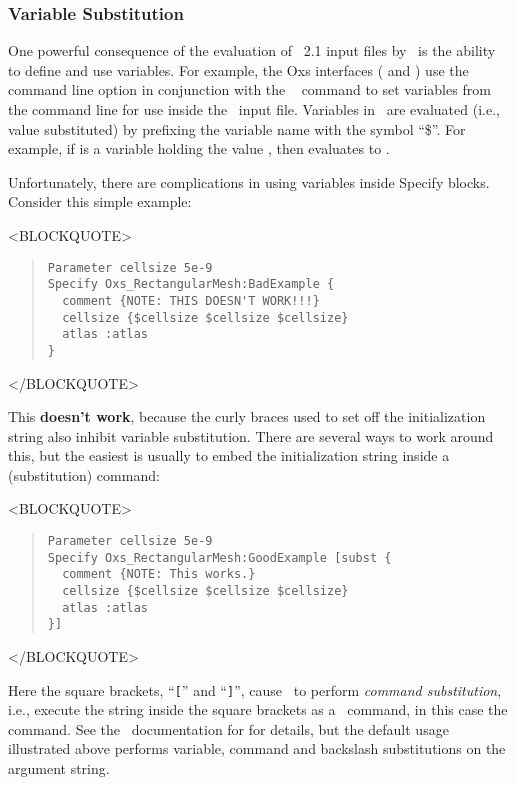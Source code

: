 \subsubsection{Variable Substitution}%
\label{sec:varSubst}
One powerful consequence of the evaluation of \MIF~2.1 input files by
\Tcl\ is the ability to define and use variables.  For example,
the Oxs interfaces ( and )
use the  command line option in conjunction with
the \MIF\  command to
set variables from the command line for use inside the \MIF\ input file.
Variables in \Tcl\ are evaluated (i.e., value substituted)
by prefixing the variable name with the symbol ``\$''.  For example, if
 is a variable holding the value , then
 evaluates to .

Unfortunately, there are complications in using variables inside
Specify blocks.  Consider this simple example:
\begin{rawhtml}<BLOCKQUOTE>\end{rawhtml}
\begin{quote}
\begin{verbatim}
Parameter cellsize 5e-9
Specify Oxs_RectangularMesh:BadExample {
  comment {NOTE: THIS DOESN'T WORK!!!}
  cellsize {$cellsize $cellsize $cellsize}
  atlas :atlas
}
\end{verbatim}
\end{quote}
\begin{rawhtml}</BLOCKQUOTE>\end{rawhtml}
This \textbf{doesn't work}, because the curly braces used to set off the
 initialization string also inhibit variable substitution.
There are several ways to work around this, but the easiest is usually
to embed the initialization string inside a  (substitution)
command:
\begin{rawhtml}<BLOCKQUOTE>\end{rawhtml}
\begin{quote}
\begin{verbatim}
Parameter cellsize 5e-9
Specify Oxs_RectangularMesh:GoodExample [subst {
  comment {NOTE: This works.}
  cellsize {$cellsize $cellsize $cellsize}
  atlas :atlas
}]
\end{verbatim}
\end{quote}
\begin{rawhtml}</BLOCKQUOTE>\end{rawhtml}
Here the square brackets, ``\texttt{[}'' and ``\texttt{]}'',
cause \Tcl\ to perform \textit{command substitution}, i.e.,
execute the string inside the square brackets as a \Tcl\
command, in this case the  command.  See the \Tcl\
documentation for  for details, but the default
usage illustrated above performs variable, command and
backslash substitutions on the argument string.

